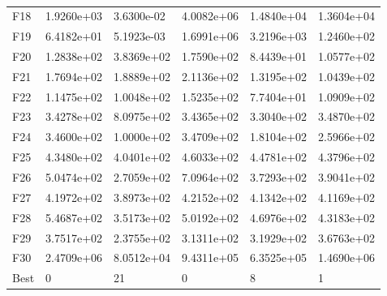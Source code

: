 \documentclass[10pt,a4paper]{article}
\begin{document}
\begin{table}[H]
\begin{center}
\begin{tabular}{llllll}
		F18  &  1.9260e+03 &  3.6300e-02 &  4.0082e+06 &  1.4840e+04 &  1.3604e+04 \\
		F19  &  6.4182e+01 &  5.1923e-03 &  1.6991e+06 &  3.2196e+03 &  1.2460e+02 \\
		F20  &  1.2838e+02 &  3.8369e+02 &  1.7590e+02 &  8.4439e+01 &  1.0577e+02 \\
		F21  &  1.7694e+02 &  1.8889e+02 &  2.1136e+02 &  1.3195e+02 &  1.0439e+02 \\
		F22  &  1.1475e+02 &  1.0048e+02 &  1.5235e+02 &  7.7404e+01 &  1.0909e+02 \\
		F23  &  3.4278e+02 &  8.0975e+02 &  3.4365e+02 &  3.3040e+02 &  3.4870e+02 \\
		F24  &  3.4600e+02 &  1.0000e+02 &  3.4709e+02 &  1.8104e+02 &  2.5966e+02 \\
		F25  &  4.3480e+02 &  4.0401e+02 &  4.6033e+02 &  4.4781e+02 &  4.3796e+02 \\
		F26  &  5.0474e+02 &  2.7059e+02 &  7.0964e+02 &  3.7293e+02 &  3.9041e+02 \\
		F27  &  4.1972e+02 &  3.8973e+02 &  4.2152e+02 &  4.1342e+02 &  4.1169e+02 \\
		F28  &  5.4687e+02 &  3.5173e+02 &  5.0192e+02 &  4.6976e+02 &  4.3183e+02 \\
		F29  &  3.7517e+02 &  2.3755e+02 &  3.1311e+02 &  3.1929e+02 &  3.6763e+02 \\
		F30  &  2.4709e+06 &  8.0512e+04 &  9.4311e+05 &  6.3525e+05 &  1.4690e+06 \\
		Best &           0 &          21 &           0 &           8 &           1 \\
		\bottomrule
\end{tabular}
\caption{}
\end{center}
\end{table}
\end{document}

